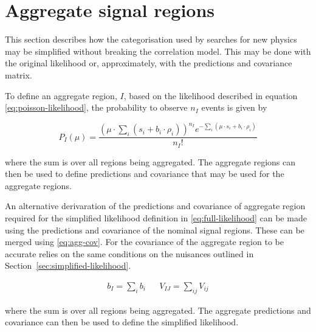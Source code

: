 \section{Aggregate signal regions}
\label{sec:aggregate-signal-regions}

This section describes how the categorisation used by searches for new
physics may be simplified without breaking the correlation model. 
This may be done with the original likelihood or, approximately,
with the predictions and covariance matrix.

To define an aggregate region, $I$, based on the likelihood described in equation
\ref{eq:poisson-likelihood}, the probability to observe $n_{I}$ events is given by

\begin{equation}
 P_{I}(\mu) = \dfrac{(\mu \cdot \sum_i(s_{i}+b_{i} \cdot \rho_{i}))^{n_{I}} e^{-\sum_i(\mu \cdot s_{i}+b_{i}\cdot\rho_{i})} }{n_{I}!}
\label{eq:agg-likelihood}
\end{equation}

where the sum is over all regions being aggregated. The aggregate regions
can then be used to define predictions and covariance that may be
used for the aggregate regions.

An alternative derivaration of the predictions and covariance of aggregate region 
required for the simplified likelihood definition in \ref{eq:full-likelihood} can
be made using the predictions and covariance of the nominal signal regions.
These can be merged using \ref{eq:agg-cov}. For the covariance of the aggregate
region to be accurate relies on the same conditions on the nuisances outlined 
in Section~\ref{sec:simplified-likelihood}. 

\begin{align}
b_{I} = \sum_i b_{i} && V_{IJ}=\sum_{ij}V_{ij}
\label{eq:agg-cov}
\end{align}

where the sum is over all regions being aggregated. The aggregate predictions
and covariance can then be used to define the simplified likelihood.

